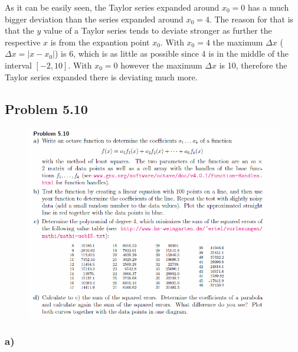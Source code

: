 As it can be easily seen, the Taylor series expanded around $x_{0} = 0$ has a much bigger deviation than the series expanded around $x_{0} = 4$. The reason for that is that the $y$ value of a Taylor series tends to deviate stronger as further the respective $x$ is from the expantion point $x_{0}$. With $x_{0} = 4$ the maximum $\Delta x$ ($\Delta x = |x - x_{0}|$) is 6, which is as little as possible since $4$ is in the middle of the interval $[-2, 10]$. With $x_{0} = 0$ however the maximum $\Delta x$ is 10, therefore the Taylor series expanded there is deviating much more.


\newpage

\subsection{Problem 5.10}

\begin{figure}[!ht]
\includegraphics[width=1\textwidth]{chapters/images/desc-5-10}
\end{figure}


\subsubsection{a)}

